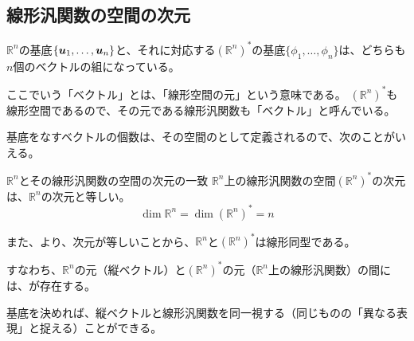 \documentclass[../../../topic_linear-algebra]{subfiles}
\begin{document}
\subsection{線形汎関数の空間の次元}

$\mathbb{R}^n$の基底$\{ \vb*{u}_1, \ldots, \vb*{u}_n \}$と、それに対応する$(\mathbb{R}^n)^*$の基底$\{ \phi_1, \ldots, \phi_n \}$は、どちらも$n$個のベクトルの組になっている。

\begin{supplnote}
  ここでいう「ベクトル」とは、「線形空間の元」という意味である。
  $(\mathbb{R}^n)^*$も線形空間であるので、その元である線形汎関数も「ベクトル」と呼んでいる。
\end{supplnote}

基底をなすベクトルの個数は、その空間のとして定義されるので、次のことがいえる。

\begin{theorem*}{$\mathbb{R}^n$とその線形汎関数の空間の次元の一致}
  $\mathbb{R}^n$上の線形汎関数の空間$(\mathbb{R}^n)^*$の次元は、$\mathbb{R}^n$の次元と等しい。
  \begin{equation*}
    \dim \mathbb{R}^n = \dim (\mathbb{R}^n)^* = n
  \end{equation*}
\end{theorem*}

また、より、次元が等しいことから、$\mathbb{R}^n$と$(\mathbb{R}^n)^*$は線形同型である。

すなわち、$\mathbb{R}^n$の元（縦ベクトル）と$(\mathbb{R}^n)^*$の元（$\mathbb{R}^n$上の線形汎関数）の間には、が存在する。

\br

基底を決めれば、縦ベクトルと線形汎関数を同一視する（同じものの「異なる表現」と捉える）ことができる。
\end{document}
